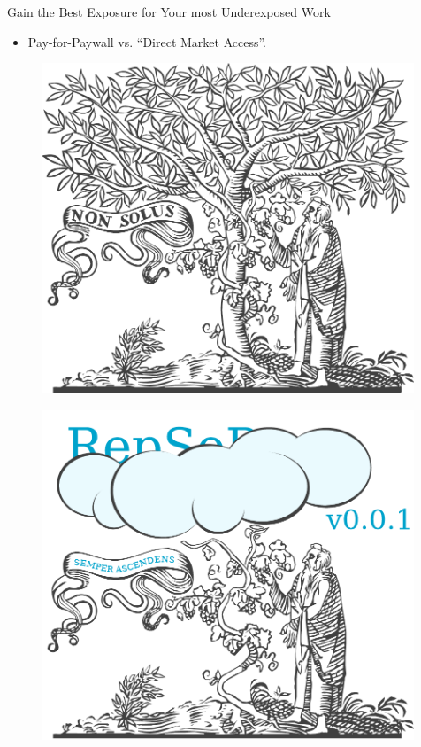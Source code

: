 			\begin{frame}{Gain the Best Exposure for Your most Underexposed Work}
				\begin{itemize}
					\item Pay-for-Paywall vs. “Direct Market Access”.
				\end{itemize}
				\begin{minipage}{0.49\textwidth}
					\begin{figure}
						\centering
						\includegraphics[width=0.99\textwidth]{img/elsevier.pdf}
					\end{figure}
				\end{minipage}
				\begin{minipage}{0.49\textwidth}
					\begin{figure}
						\centering
						\includegraphics[width=0.99\textwidth]{img/repsep.pdf}
					\end{figure}
				\end{minipage}
			\end{frame}

